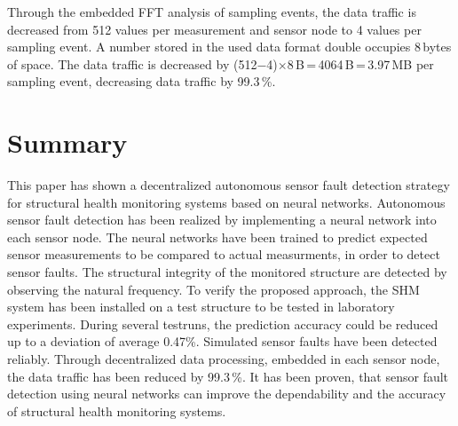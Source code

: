 \documentclass[12pt,a4paper]{scrartcl}
\begin{document}
Through the embedded FFT analysis of sampling events, the data traffic is decreased from 512 values per measurement and sensor node to 4 values per sampling event.
A number stored in the used data format double occupies 8\,bytes of space.
The data traffic is decreased by (512$-$4)$\times$8\,B\,=\,4064\,B\,=\,3.97\,MB per sampling event, decreasing data traffic by 99.3\,\%.


\section*{Summary}

This paper has shown a decentralized autonomous sensor fault detection strategy for structural health monitoring systems based on neural networks. 
Autonomous sensor fault detection has been realized by implementing a neural network into each sensor node.
The neural networks have been trained to predict expected sensor measurements to be compared to actual measurments, in order to detect sensor faults.
The structural integrity of the monitored structure are detected by observing the natural frequency.
To verify the proposed approach, the SHM system has been installed on a test structure to be tested in laboratory experiments.
During several testruns, the prediction accuracy could be reduced up to a deviation of average 0.47\%.
Simulated sensor faults have been detected reliably.
Through decentralized data processing, embedded in each sensor node, the data traffic has been reduced by 99.3\,\%.
It has been proven, that sensor fault detection using neural networks can improve the dependability and the accuracy of structural health monitoring systems.




\end{document}
